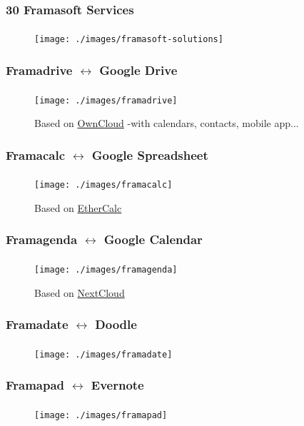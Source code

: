 	\begin{frame}
	\frametitle{30 Framasoft Services}
	\framesubtitle{}
	        \begin{figure}[h]
                \centering
                \texttt{[image: ./images/framasoft-solutions]}
        	\end{figure}
	\end{frame}

	\begin{frame}
	\frametitle{Framadrive $\leftrightarrow$ Google Drive}
	\framesubtitle{}
	        \begin{figure}[h]
                \centering
                \texttt{[image: ./images/framadrive]}
		\caption{Based on \href{https://owncloud.org/}{OwnCloud} -with calendars, contacts, mobile app...}
        	\end{figure}
	\end{frame}

	\begin{frame}
	\frametitle{Framacalc $\leftrightarrow$ Google Spreadsheet}
	\framesubtitle{}
	        \begin{figure}[h]
                \centering
                \texttt{[image: ./images/framacalc]}
		\caption{Based on \href{https://ethercalc.net}{EtherCalc}}
        	\end{figure}
	\end{frame}

	\begin{frame}
	\frametitle{Framagenda $\leftrightarrow$ Google Calendar}
	\framesubtitle{}
	        \begin{figure}[h]
                \centering
                \texttt{[image: ./images/framagenda]}
		\caption{Based on \href{https://nextcloud.com}{NextCloud}}
        	\end{figure}
	\end{frame}

	\begin{frame}
	\frametitle{Framadate $\leftrightarrow$ Doodle}
	\framesubtitle{}
	        \begin{figure}[h]
                \centering
                \texttt{[image: ./images/framadate]}
        	\end{figure}
	\end{frame}

	\begin{frame}
	\frametitle{Framapad $\leftrightarrow$ Evernote}
	\framesubtitle{}
	        \begin{figure}[h]
                \centering
                \texttt{[image: ./images/framapad]}
        	\end{figure}
	\end{frame}

